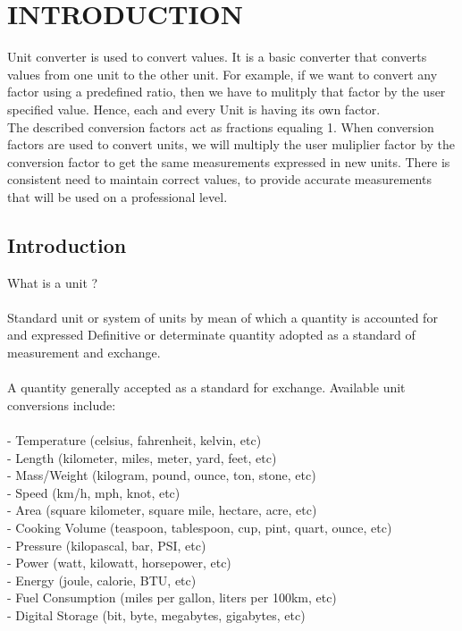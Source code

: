 \documentclass[a4paper, 12pt]{report}
\begin{document}
\newpage
{}
\chapter{INTRODUCTION}\hspace{0.8cm}Unit converter is used to convert values. It is a basic converter that converts values from one unit to the other unit. For example, if we want to convert any factor using a predefined ratio, then we have to mulitply that factor by the user specified value. Hence, each and every Unit is having its own factor.
\newline\\
\hspace*{0.8cm}
The described conversion factors act as fractions equaling 1. When conversion factors are used to convert units, we will multiply the user muliplier factor by the conversion factor to get the same measurements expressed in new units. There is consistent need to maintain correct values, to provide accurate measurements that will be used on a professional level. 
\section{Introduction}
What is a unit ?\\\\
\hspace*{0.8cm}Standard unit or system of units by mean of which a quantity is accounted for and expressed
Definitive or determinate quantity adopted as a standard of measurement and exchange. \\\\
\hspace*{0.8cm}A quantity generally accepted as a standard for exchange.
Available unit conversions include:\\
\\-     Temperature (celsius, fahrenheit, kelvin, etc)\\
-     Length (kilometer, miles, meter, yard, feet, etc)\\
-     Mass/Weight (kilogram, pound, ounce, ton, stone, etc)\\
-     Speed (km/h, mph, knot, etc)\\
-     Area (square kilometer, square mile, hectare, acre, etc)\\
-     Cooking Volume (teaspoon, tablespoon, cup, pint, quart, ounce, etc)\\
-     Pressure (kilopascal, bar, PSI, etc)\\
-     Power (watt, kilowatt, horsepower, etc)\\
-     Energy (joule, calorie, BTU, etc)\\
-     Fuel Consumption (miles per gallon, liters per 100km, etc)\\
-     Digital Storage (bit, byte, megabytes, gigabytes, etc)\\
\end{document}
